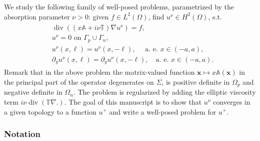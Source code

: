 \documentclass[report]{elsarticle}
\newtheorem{remark}[theorem]{Remark}
\numberwithin{theorem}{section}
\renewcommand{\vec}[1]{\mathbf{#1}}
\begin{document}
We study the following family of well-posed problems, parametrized by the absorption parameter $\nu>0$: given $f\in L^2(\Omega)$, find $u^{\nu}\in H^2(\Omega)$, s.t. 
\begin{align}
	\label{eq:unu}
	\begin{split}
		& \operatorname{div}((x\mathbb{A}+i\nu\mathbb{T})\nabla u^{\nu})=f, \\
		&u^{\nu}=0 \text{ on }\Gamma_p\cup\Gamma_n, \\
		&u^{\nu}(x,\ell)=u^{\nu}(x, -\ell), \quad \text{ a. e. }x\in (-a, a),\\
		&\partial_y u^{\nu}(x,\ell)=\partial_y u^{\nu}(x, -\ell), \quad \text{a. e. }x\in (-a, a).
	\end{split}
\end{align}
Remark that in the above problem the matrix-valued function $\vec{x}\mapsto x\mathbb{A}(\vec{x})$ in the principal part of the operator degenerates on $\Sigma$, is positive definite in $\Omega_p$ and negative definite in $\Omega_n$. The problem is regularized by adding the elliptic viscosity term $i\nu\operatorname{div}(\mathbb{T}\nabla .)$. The goal of this manuscript is to show that $u^{\nu}$ converges in a given topology to a function $u^+$ and write a well-posed problem for $u^+$. 












\subsubsection{Notation}
\end{document}
